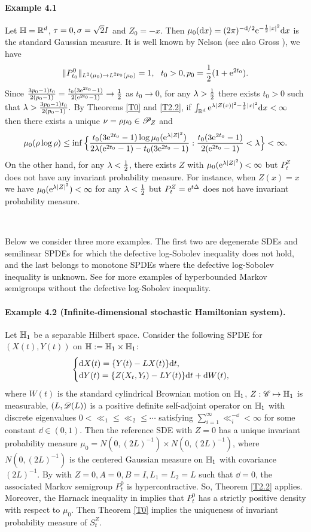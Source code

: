 \documentclass[12pt,leqno]{article}
\theoremstyle{definition}
\newcommand{\scr}[1]{\mathscr #1}
\numberwithin{equation}{section} \theoremstyle{remark}
\begin{document}
\paragraph{Example 4.1} Let $\H=\R^d$, $\tau=0, \si=\ss 2 I$ and $Z_0=-x$. Then $\mu_0(\d x)= (2\pi)^{-\d/2} \e^{-\ff 1 2|x|^2}\d x$ is the standard Gaussian measure. It is well known by Nelson \cite{Nel} (see also Gross \cite{Gross}), we have
$$\|P_{t_0}^0\|_{L^2(\mu_0)\to L^{2p_0}(\mu_0)}=1,\ \ t_0>0, p_0=\ff 1 2(1+\e^{2t_0}).$$
Since $\ff{3p_0-1)t_0}{2(p_0-1)}= \ff{t_0(3\e^{2t_0}-1)}{2(\e^{2t_0}-1)}\to \ff 1 2$ as $t_0\to 0$,  for any $\ll>\ff 1 2$  there exists $t_0>0$ such that $\ll> \ff{3p_0-1)t_0}{2(p_0-1)}.$ By Theorems \ref{T0} and \ref{T2.2}, if
$\int_{\R^d}\e^{\ll |Z(x)|^2- \ff 1 2|x|^2}\d x<\infty$ then there exists a unique $\nu=\rr\mu_0\in\scr P_Z$ and
$$\mu_0(\rr\log \rr)\le \inf\Big\{  \ff{t_0 (3\e^{2t_0}-1)\log \mu_0(\e^{\ll|Z|^2})}{2\ll(\e^{2t_0}-1)- t_0 (3\e^{2t_0}-1)}:  \ff{t_0(3\e^{2t_0}-1)}{2(\e^{2t_0}-1)}<\ll\Big\}<\infty. $$
On the other hand, for any $\ll<\ff 1 2$, there exists $Z$ with $\mu_0(\e^{\ll|Z|^2})<\infty$ but $P_t^Z$ does not have any invariant probability measure. For instance, when $Z(x)=x$ we have $\mu_0(\e^{\ll |Z|^2})<\infty$ for any $\ll<\ff 1 2$ but $P_t^Z=\e^{t\DD}$ does not have invariant probability measure.

\

Below we   consider   three more examples.  The first two are  degenerate SDEs and semilinear SPDEs for which the defective log-Sobolev inequality does not hold, and the last belongs to  monotone  SPDEs where the defective log-Sobolev inequality is unknown. See \cite{Liu, W07, W15} for more examples of hyperbounded  Markov semigroups without the defective log-Sobolev inequality.

\paragraph{Example 4.2 (Infinite-dimensional stochastic Hamiltonian system).} Let   $\H_1$ be a separable Hilbert space. Consider the following SPDE for $(X(t),Y(t))$ on $\H:=\H_1\times\H_1$:
$$ \beg{cases}\d X(t)=\{ Y(t)-LX(t)\}\d t,\\
\d Y(t)= \{Z(X_t,Y_t)-L Y(t)\}\d t + \d W(t),\end{cases}$$
where $W(t)$ is the standard cylindrical Brownian motion on $\H_1$, $Z: \C\mapsto \H_1$  is measurable, $(L,\D(L))$ is a positive definite self-adjoint operator on $\H_1$ with discrete eigenvalues $0<\ll_1\le\ll_2\le\cdots$ satisfying $\sum_{i=1}^\infty \ll_i^{-\dd}<\infty$ for some constant $\dd\in (0,1).$ Then the reference SDE with $Z=0$ has a unique invariant probability measure
$\mu_0= N(0, (2L)^{-1})\times N(0, (2L)^{-1})$, where  $N(0, (2L)^{-1})$ is the centered Gaussian measure on $\H_1$ with covariance $(2L)^{-1}.$ By \cite[Theorem 4.1]{W15b} with $Z=0, A=0, B=I, L_1=L_2=L$ such that $\dd=0$, the associated Markov semigroup $P_t^0$ is
hypercontractive. So,    Theorem \ref{T2.2} applies. Moreover, the Harnack inequality in \cite[Lemma 4.2]{W15b} implies that $P_t^0$ has a strictly positive density with respect to $\mu_0$. Then  Theorem \ref{T0} implies the uniqueness of invariant probability measure of $S_t^Z$.
\end{document}
